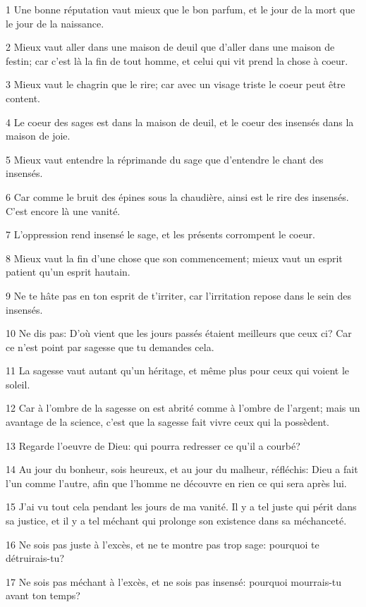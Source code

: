 \par 1 Une bonne réputation vaut mieux que le bon parfum, et le jour de la mort que le jour de la naissance.
\par 2 Mieux vaut aller dans une maison de deuil que d'aller dans une maison de festin; car c'est là la fin de tout homme, et celui qui vit prend la chose à coeur.
\par 3 Mieux vaut le chagrin que le rire; car avec un visage triste le coeur peut être content.
\par 4 Le coeur des sages est dans la maison de deuil, et le coeur des insensés dans la maison de joie.
\par 5 Mieux vaut entendre la réprimande du sage que d'entendre le chant des insensés.
\par 6 Car comme le bruit des épines sous la chaudière, ainsi est le rire des insensés. C'est encore là une vanité.
\par 7 L'oppression rend insensé le sage, et les présents corrompent le coeur.
\par 8 Mieux vaut la fin d'une chose que son commencement; mieux vaut un esprit patient qu'un esprit hautain.
\par 9 Ne te hâte pas en ton esprit de t'irriter, car l'irritation repose dans le sein des insensés.
\par 10 Ne dis pas: D'où vient que les jours passés étaient meilleurs que ceux ci? Car ce n'est point par sagesse que tu demandes cela.
\par 11 La sagesse vaut autant qu'un héritage, et même plus pour ceux qui voient le soleil.
\par 12 Car à l'ombre de la sagesse on est abrité comme à l'ombre de l'argent; mais un avantage de la science, c'est que la sagesse fait vivre ceux qui la possèdent.
\par 13 Regarde l'oeuvre de Dieu: qui pourra redresser ce qu'il a courbé?
\par 14 Au jour du bonheur, sois heureux, et au jour du malheur, réfléchis: Dieu a fait l'un comme l'autre, afin que l'homme ne découvre en rien ce qui sera après lui.
\par 15 J'ai vu tout cela pendant les jours de ma vanité. Il y a tel juste qui périt dans sa justice, et il y a tel méchant qui prolonge son existence dans sa méchanceté.
\par 16 Ne sois pas juste à l'excès, et ne te montre pas trop sage: pourquoi te détruirais-tu?
\par 17 Ne sois pas méchant à l'excès, et ne sois pas insensé: pourquoi mourrais-tu avant ton temps?
